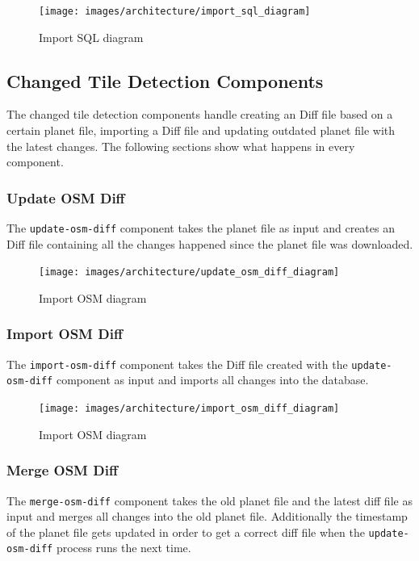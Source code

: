\begin{figure}[H]
  \centering
  \texttt{[image: images/architecture/import\_sql\_diagram]}
  \caption{Import SQL diagram}
\end{figure}

\subsection{Changed Tile Detection Components}

The changed tile detection components handle creating an \osm{} Diff file based on a certain \osm{} planet file, importing a \osm{} Diff file and updating outdated \osm{} planet file with the latest changes. The following sections show what happens in every component.

\subsubsection{Update OSM Diff}

The \texttt{update-osm-diff} component takes the planet file as input and creates an \osm{} Diff file containing all the changes happened since the planet file was downloaded.

\begin{figure}[H]
  \centering
  \texttt{[image: images/architecture/update\_osm\_diff\_diagram]}
  \caption{Import OSM diagram}
\end{figure}

\subsubsection{Import OSM Diff}

The \texttt{import-osm-diff} component takes the \osm{} Diff file created with the \texttt{update-osm-diff} component as input and imports all changes into the database.

\begin{figure}[H]
  \centering
  \texttt{[image: images/architecture/import\_osm\_diff\_diagram]}
  \caption{Import OSM diagram}
\end{figure}

\subsubsection{Merge OSM Diff}

The \texttt{merge-osm-diff} component takes the old planet file and the latest diff file as input and merges all changes into the old planet file. Additionally the timestamp of the planet file gets updated in order to get a correct diff file when the \texttt{update-osm-diff} process runs the next time.

